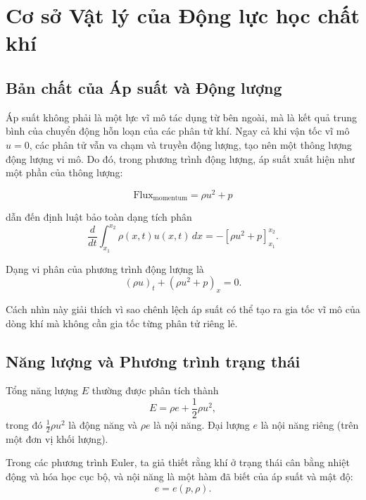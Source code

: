 \section{Cơ sở Vật lý của Động lực học chất khí}
\subsection{Bản chất của Áp suất và Động lượng}

Áp suất không phải là một lực vĩ mô tác dụng từ bên ngoài, mà là kết quả trung bình của chuyển động hỗn loạn của các phân tử khí. Ngay cả khi vận tốc vĩ mô $u = 0$, các phân tử vẫn va chạm và truyền động lượng, tạo nên một thông lượng động lượng vi mô. Do đó, trong phương trình động lượng, áp suất xuất hiện như một phần của thông lượng:

\begin{equation*}
    \text{Flux}_{\text{momentum}} = \rho u^2 + p
\end{equation*}

dẫn đến định luật bảo toàn dạng tích phân
\begin{equation*}
\frac{d}{dt} \int_{x_1}^{x_2} \rho(x,t)u(x,t)\,dx
= -[\rho u^2 + p]_{x_1}^{x_2}.
\end{equation*}

Dạng vi phân của phương trình động lượng là
\begin{equation*}
(\rho u)_t + (\rho u^2 + p)_x = 0.
\end{equation*}

Cách nhìn này giải thích vì sao chênh lệch áp suất có thể tạo ra gia tốc vĩ mô của dòng khí mà không cần gia tốc từng phân tử riêng lẻ.

\subsection{Năng lượng và Phương trình trạng thái}

Tổng năng lượng $E$ thường được phân tích thành
\begin{equation*}
E = \rho e + \frac12 \rho u^2,
\end{equation*}
trong đó $\frac12\rho u^2$ là động năng và $\rho e$ là nội năng. Đại lượng $e$ là nội năng riêng (trên một đơn vị khối lượng).

Trong các phương trình Euler, ta giả thiết rằng khí ở trạng thái cân bằng nhiệt động và hóa học cục bộ, và nội năng là một hàm đã biết của áp suất và mật độ:
\begin{equation*}
e = e(p,\rho).
\end{equation*}

